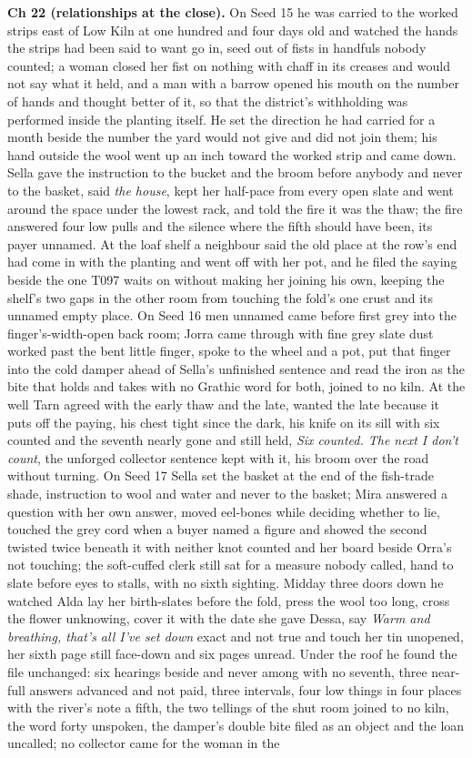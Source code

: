\documentclass{design/chronicle}
\begin{document}
{\textbf{Ch 22 (relationships at the close).} On Seed 15 he was carried to the worked strips east of Low Kiln at one hundred and four days old and watched the hands the strips had been said to want go in, seed out of fists in handfuls nobody counted; a woman closed her fist on nothing with chaff in its creases and would not say what it held, and a man with a barrow opened his mouth on the number of hands and thought better of it, so that the district’s withholding was performed inside the planting itself. He set the direction he had carried for a month beside the number the yard would not give and did not join them; his hand outside the wool went up an inch toward the worked strip and came down. Sella gave the instruction to the bucket and the broom before anybody and never to the basket, said \emph{the house}, kept her half-pace from every open slate and went around the space under the lowest rack, and told the fire it was the thaw; the fire answered four low pulls and the silence where the fifth should have been, its payer unnamed. At the loaf shelf a neighbour said the old place at the row’s end had come in with the planting and went off with her pot, and he filed the saying beside the one T097 waits on without making her joining his own, keeping the shelf’s two gaps in the other room from touching the fold’s one crust and its unnamed empty place. On Seed 16 men unnamed came before first grey into the finger’s-width-open back room; Jorra came through with fine grey slate dust worked past the bent little finger, spoke to the wheel and a pot, put that finger into the cold damper ahead of Sella’s unfinished sentence and read the iron as the bite that holds and takes with no Grathic word for both, joined to no kiln. At the well Tarn agreed with the early thaw and the late, wanted the late because it puts off the paying, his chest tight since the dark, his knife on its sill with six counted and the seventh nearly gone and still held, \emph{Six counted. The next I don’t count}, the unforged collector sentence kept with it, his broom over the road without turning. On Seed 17 Sella set the basket at the end of the fish-trade shade, instruction to wool and water and never to the basket; Mira answered a question with her own answer, moved eel-bones while deciding whether to lie, touched the grey cord when a buyer named a figure and showed the second twisted twice beneath it with neither knot counted and her board beside Orra’s not touching; the soft-cuffed clerk still sat for a measure nobody called, hand to slate before eyes to stalls, with no sixth sighting. Midday three doors down he watched Alda lay her birth-slates before the fold, press the wool too long, cross the flower unknowing, cover it with the date she gave Dessa, say \emph{Warm and breathing, that’s all I’ve set down} exact and not true and touch her tin unopened, her sixth page still face-down and six pages unread. Under the roof he found the file unchanged: six hearings beside and never among with no seventh, three near-full answers advanced and not paid, three intervals, four low things in four places with the river’s note a fifth, the two tellings of the shut room joined to no kiln, the word forty unspoken, the damper’s double bite filed as an object and the loan uncalled; no collector came for the woman in the }
\end{document}
